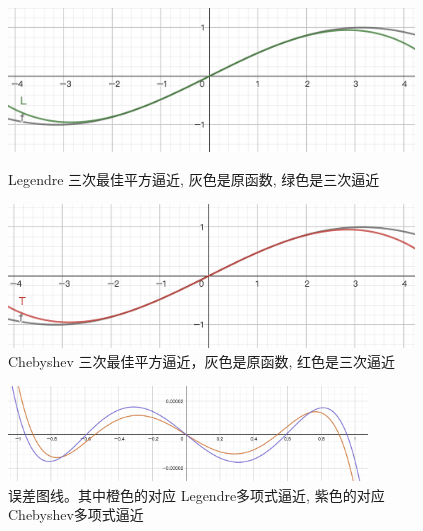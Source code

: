 \documentclass{article}
\begin{document}
\begin{spacing}{1.5}
\begin{itemize}
\begin{itemize}
        \begin{figure}[htb]
            \begin{minipage}[t]{0.48\textwidth}
                \centering
                \includegraphics[width=0.96\textwidth]{截屏2022-12-03 16.16.31.png}
                \caption{Legendre 三次最佳平方逼近, 灰色是原函数, 绿色是三次逼近}
                \label{Legendre}
            \end{minipage}
            \begin{minipage}[t]{0.48\textwidth}
                \centering
                \includegraphics[width=0.96\textwidth]{截屏2022-12-03 16.44.00.png}
                \caption{Chebyshev 三次最佳平方逼近，灰色是原函数, 红色是三次逼近}
                \label{Chebyshev}
            \end{minipage}
        \end{figure}

        \begin{figure}[htb]
            \centering
            \includegraphics[width=0.85\textwidth]{截屏2022-12-03 17.13.31.png}
            \caption{误差图线。其中橙色的对应 Legendre多项式逼近, 紫色的对应 Chebyshev多项式逼近}
        \end{figure}
    \end{itemize}


\end{itemize}
\end{spacing}
\end{document}
